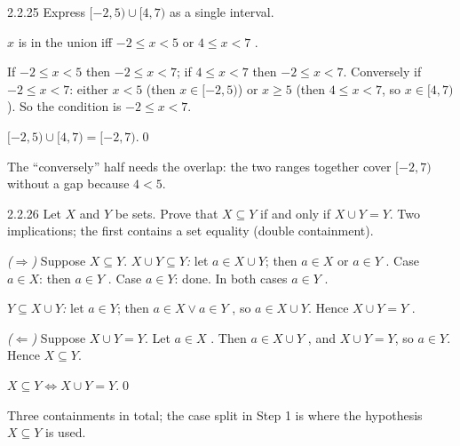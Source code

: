 \begin{bookex}[recommended]{2.2.25}
Express $[-2,5)\cup[4,7)$ as a single interval.
\solution
\begin{steps}
\item $x$ is in the union iff $-2\le x<5$ or $4\le x<7$ .
\item If $-2\le x<5$ then $-2\le x<7$; if $4\le x<7$ then $-2\le x<7$. Conversely if $-2\le x<7$: either $x<5$ (then $x\in[-2,5)$) or $x\ge5$ (then $4\le x<7$, so $x\in[4,7)$). So the condition is $-2\le x<7$.
\end{steps}
\answer $[-2,5)\cup[4,7)=[-2,7)$.\qed
\begin{compare}
\item The ``conversely'' half needs the overlap: the two ranges together cover $[-2,7)$ without a gap because $4<5$.
\end{compare}
\end{bookex}

\begin{bookex}[essential]{2.2.26}
Let $X$ and $Y$ be sets. Prove that $X\subseteq Y$ if and only if $X\cup Y=Y$.
\solution
\goal Two implications; the first contains a set equality (double containment).
\begin{steps}
\item \emph{($\Rightarrow$)} Suppose $X\subseteq Y$. \emph{$X\cup Y\subseteq Y$:} let $a\in X\cup Y$; then $a\in X$ or $a\in Y$ . Case $a\in X$: then $a\in Y$ . Case $a\in Y$: done. In both cases $a\in Y$ .
\item \emph{$Y\subseteq X\cup Y$:} let $a\in Y$; then $a\in X\vee a\in Y$ , so $a\in X\cup Y$. Hence $X\cup Y=Y$ .
\item \emph{($\Leftarrow$)} Suppose $X\cup Y=Y$. Let $a\in X$ . Then $a\in X\cup Y$ , and $X\cup Y=Y$, so $a\in Y$. Hence $X\subseteq Y$.
\end{steps}
\conclusion $X\subseteq Y\Leftrightarrow X\cup Y=Y$.\qed
\begin{compare}
\item Three containments in total; the case split in Step 1 is where the hypothesis $X\subseteq Y$ is used.
\end{compare}
\end{bookex}

